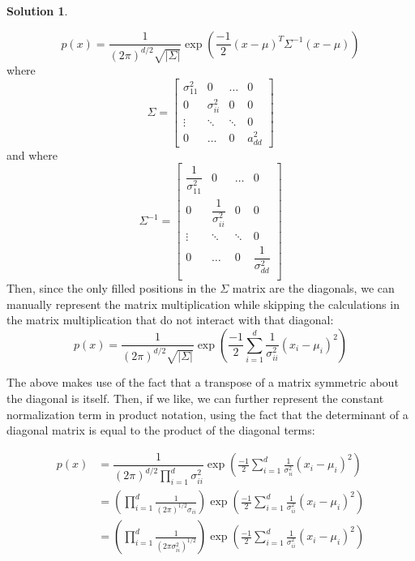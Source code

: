 \documentclass[letterpaper, 12pt]{article}
\theoremstyle{definition}
\newtheorem*{solution}{Solution}
\begin{document}
\begin{solution}
\begin{enumerate}[1.]
\begin{enumerate}[(a)]
                	\begin{equation*}
                    	p(x) = \dfrac{1}{(2\pi)^{d/2} \sqrt{|\Sigma|}} \exp(\frac{-1}{2}(x-\mu)^{T}\Sigma^{-1}(x-\mu))
                    \end{equation*}
                 where \[ \Sigma = \begin{bmatrix} 
    					\sigma_{11}^2 & 0 & \dots & 0 \\
    					0 &  \sigma_{ii}^2 & 0 & 0\\
                        \vdots & \ddots & \ddots  & 0 \\
   						 0 &   \dots &  0  & a_{dd}^2 
    					\end{bmatrix}
                 \]
                 and where
                 \[ \Sigma^{-1} = \begin{bmatrix} 
    					\dfrac{1}{\sigma_{11}^2} & 0 & \dots & 0 \\
    					0 & \dfrac{1}{\sigma_{ii}^2} & 0 & 0\\
                        \vdots & \ddots & \ddots  & 0 \\
   						 0 &   \dots &  0  & \dfrac{1}{\sigma_{dd}^2 }\\
    					\end{bmatrix}
                 \]
                Then, since the only filled positions in the $\Sigma$ matrix are the diagonals, we can manually represent the matrix multiplication while skipping the calculations in the matrix multiplication that do not interact with that diagonal:
                	\begin{equation*}
                		p(x) = \dfrac{1}{(2\pi)^{d/2} \sqrt{|\Sigma|}} \exp( \frac{-1}{2} \sum_{i=1}^{d} \frac{1}{\sigma_{ii}^{2}} (x_{i} - \mu_{i})^{2} )
                	\end{equation*}
                
                The above makes use of the fact that a transpose of a matrix symmetric about the diagonal is itself. Then, if we like, we can further represent the constant normalization term in product notation, using the fact that the determinant of a diagonal matrix is equal to the product of the diagonal terms:
                
                \begin{equation*}
                	\begin{split}
                    	p(x) & = \dfrac{1}{(2\pi)^{d/2} \prod_{i=1}^{d} \sigma^{2}_{ii}} \exp( \frac{-1}{2} \sum_{i=1}^{d} \frac{1}{\sigma_{ii}^{2}} (x_{i} - \mu_{i})^{2} ) \\
                        & = (\prod_{i=1}^{d} \frac{1}{(2\pi)^{1/2} \sigma_{ii} }) \exp( \frac{-1}{2} \sum_{i=1}^{d} \frac{1}{\sigma_{ii}^{2}} (x_{i} - \mu_{i})^{2} ) \\
                        & = (\prod_{i=1}^{d} \frac{1}{(2\pi \sigma_{ii}^2)^{1/2} }) \exp( \frac{-1}{2} \sum_{i=1}^{d} \frac{1}{\sigma_{ii}^{2}} (x_{i} - \mu_{i})^{2} )
                    \end{split}
                \end{equation*}
                

\end{enumerate}
\end{enumerate}
\end{solution}
\end{document}
